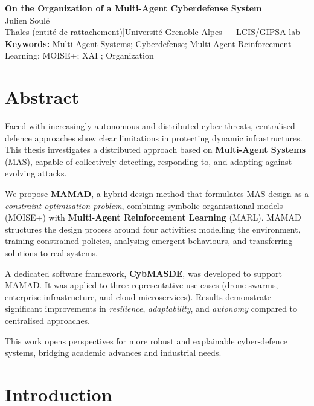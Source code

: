 \documentclass[a4paper,10pt,twocolumn]{article}
\newcommand{\BookletTitle}{On the Organization of a Multi-Agent Cyberdefense System}
\newcommand{\AuthorName}{Julien Soulé}
\newcommand{\ThalesEntity}{Thales (entité de rattachement)}
\newcommand{\UniversityLab}{Université Grenoble Alpes — LCIS/GIPSA-lab}
\newcommand{\Keywords}{Multi-Agent Systems; Cyberdefense; Multi-Agent Reinforcement Learning; MOISE+; XAI ; Organization}
\begin{document}
\begin{center}
    {\LARGE \textbf{\BookletTitle}}\\[4pt]
    {\large \AuthorName}\\[2pt]
    {\small \ThalesEntity \quad|\quad \UniversityLab}\\[4pt]
    \textbf{Keywords:} \Keywords
\end{center}

\section*{Abstract}

Faced with increasingly autonomous and distributed cyber threats,
centralised defence approaches show clear limitations in protecting
dynamic infrastructures. This thesis investigates a distributed approach
based on \textbf{Multi-Agent Systems} (MAS), capable of collectively
detecting, responding to, and adapting against evolving attacks.

We propose \textbf{MAMAD}, a hybrid design method that formulates MAS
design as a \emph{constraint optimisation problem}, combining symbolic
organisational models (MOISE+) with \textbf{Multi-Agent Reinforcement
    Learning} (MARL). MAMAD structures the design process around four
activities: modelling the environment, training constrained policies,
analysing emergent behaviours, and transferring solutions to real
systems.

A dedicated software framework, \textbf{CybMASDE}, was developed to
support MAMAD. It was applied to three representative use cases
(drone swarms, enterprise infrastructure, and cloud microservices).
Results demonstrate significant improvements in \emph{resilience},
\emph{adaptability}, and \emph{autonomy} compared to centralised
approaches.

This work opens perspectives for more robust and explainable
cyber-defence systems, bridging academic advances and industrial
needs.


\section{Introduction}
\end{document}
